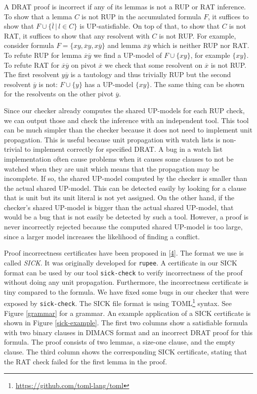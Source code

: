\documentclass[
]{report}
\begin{document}
A DRAT proof is incorrect if any of its lemmas is not a RUP or RAT
inference. To show that a lemma \(C\) is not RUP in the accumulated
formula \(F\), it suffices to show that
\(F \cup \{ \overline{l} \,|\, l \in C \}\) is UP-satisfiable. On top of
that, to show that \(C\) is not RAT, it suffices to show that any
resolvent with \(C\) is not RUP. For example, consider formula
\(F = \{xy, \overline{x}y, x\overline{y}\}\) and lemma
\(\overline{x}\overline{y}\) which is neither RUP nor RAT. To refute RUP
for lemma \(\overline{x}\overline{y}\) we find a UP-model of
\(F \cup \{xy\}\), for example \(\{xy\}\). To refute RAT for
\(\overline{x}\overline{y}\) on pivot \(\overline{x}\) we check that
some resolvent on \(\overline{x}\) is not RUP. The first resolvent
\(y\overline{y}\) is a tautology and thus trivially RUP but the second
resolvent \(\overline{y}\) is not: \(F \cup \{y\}\) has a UP-model
\(\{xy\}\). The same thing can be shown for the resolvents on the other
pivot \(\overline{y}\).

Since our checker already computes the shared UP-models for each RUP
check, we can output those and check the inference with an independent
tool. This tool can be much simpler than the checker because it does not
need to implement unit propagation. This is useful because unit
propagation with watch lists is non-trivial to implement correctly for
specified DRAT. A bug in a watch list implementation often cause
problems when it causes some clauses to not be watched when they are
unit which means that the propagation may be incomplete. If so, the
shared UP-model computed by the checker is smaller than the actual
shared UP-model. This can be detected easily by looking for a clause
that is unit but its unit literal is not yet assigned. On the other
hand, if the checker's shared UP-model is bigger than the actual shared
UP-model, that would be a bug that is not easily be detected by such a
tool. However, a proof is never incorrectly rejected because the
computed shared UP-model is too large, since a larger model increases
the likelihood of finding a conflict.

Proof incorrectness certificates have been proposed in
{[}\protect\hyperlink{ref-DBLP:confux2fsatux2fRebola-PardoB18}{4}{]}.
The format we use is called \emph{SICK}. It was originally developed for
\texttt{rupee}. A certificate in our SICK format can be used by our tool
\texttt{sick-check} to verify incorrectness of the proof without doing
any unit propagation. Furthermore, the incorrectness certificate is tiny
compared to the formula. We have fixed some bugs in our checker that
were exposed by \texttt{sick-check}. The SICK file format is using
TOML\footnote{\url{https://github.com/toml-lang/toml}} syntax. See
Figure \ref{grammar} for a grammar. An example application of a SICK
certificate is shown in Figure \ref{sick-example}. The first two columns
show a satisfiable formula with two binary clauses in DIMACS format and
an incorrect DRAT proof for this formula. The proof consists of two
lemmas, a size-one clause, and the empty clause. The third column shows
the corresponding SICK certificate, stating that the RAT check failed
for the first lemma in the proof.
\end{document}
